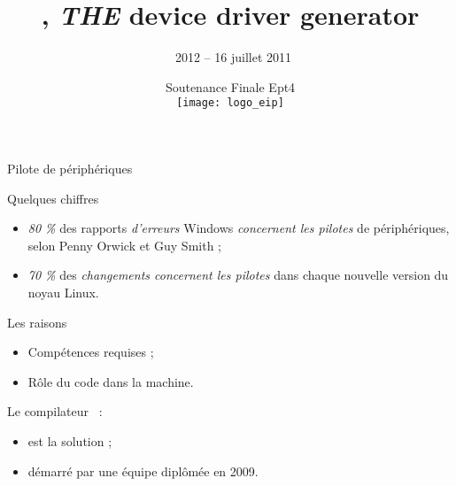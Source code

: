 \documentclass{beamer}
\title{\rtx, \emph{THE} device driver generator}
\date[Soutenance Finale Ept4]{Soutenance Finale Ept4 \\ \vspace{10pt} \texttt{[image: logo\_eip]}}
\author[\rtx\ 2012 -- 16 juillet 2011]{\rtx\ 2012 -- 16 juillet 2011 \vspace{-20pt}}
\newcommand{\cemph}[1]{{\itshape{\textcolor{rathaxesred}{#1}}}}
\begin{document}
\begin{frame}
\titlepage
\end{frame}

\begin{frame}{Pilote de périphériques}
\begin{center}


\end{center}
\end{frame}

\begin{frame}{Quelques chiffres}
\Large{
\begin{itemize}
\setlength{\itemsep}{1em}
\item {\LARGE \emph{80 \%}} des rapports \cemph{d'erreurs} Windows \cemph{concernent les pilotes} de périphériques, selon Penny Orwick et Guy Smith ;
\item {\LARGE \emph{70 \%}} des \cemph{changements concernent les pilotes} dans chaque nouvelle version du noyau Linux.
\end{itemize}
}
\end{frame}

\begin{frame}{Les raisons}
\LARGE{
\begin{itemize}
\item Compétences requises ;
\item Rôle du code dans la machine.
\end{itemize}
}
\end{frame}

\begin{frame}{\rtx}
\LARGE{Le compilateur \rtx\ :}
\Large{
\vspace{1em}
\begin{itemize}
\item est la solution ;
\item démarré par une équipe diplômée en 2009.
\end{itemize}
}
\end{frame}
\end{document}
